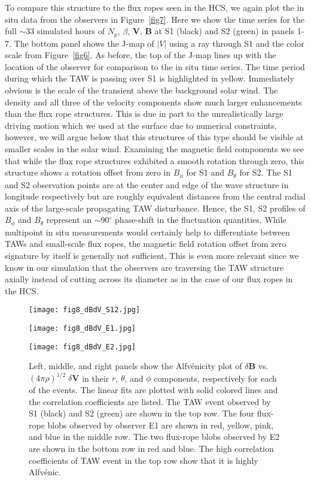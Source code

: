 \documentclass[preprint]{aastex62}
\begin{document}
To compare this structure to the flux ropes seen in the HCS, we
again plot the in situ data from the observers in Figure~\ref{fig7}.
Here we show the time series for the full $\sim$33 simulated hours of
$N_p$, $\beta$, $\boldsymbol{V}$, $\boldsymbol{B}$ at S1 (black) and
S2 (green) in panels 1-7. 
%
%
The bottom panel
shows the J-map of $|V|$ using a ray through S1 and the color scale
from Figure~\ref{fig6}. As before, the top of the J-map lines up
with the location of the observer for comparison to the in situ
time series. The time period during which the TAW is passing over
S1 is highlighted in yellow. Immediately obvious is the scale of
the transient above the background solar wind. The density and all
three of the velocity components show much larger enhancements
than the flux rope structures. This is due in part to the unrealistically
large driving motion which we used at the surface due to numerical
constraints, however, we will argue below that this structures of this type should
be visible at smaller scales in the solar wind. Examining the
magnetic field components we see that while the flux rope structures
exhibited a smooth rotation through zero, this structure shows a
rotation offset from zero in $B_\phi$ for S1 and $B_\theta$ for S2.
%
The S1 and S2 observation points are at the center and edge of the wave structure in 
longitude respectively but are roughly equivalent distances from the central radial axis of 
the large-scale propagating TAW disturbance. Hence, the S1, S2 profiles of $B_\phi$ and $B_\theta$ 
represent an $\sim$90$^\circ$ phase-shift in the fluctuation quantities.
%
While multipoint in situ measurements would certainly help to differentiate 
between TAWs and small-scale flux ropes, the magnetic field rotation offset 
from zero signature by itself is generally not sufficient. 
%
This is even more relevant since we know in our simulation that the observers 
are traversing the TAW structure axially instead of cutting across its diameter 
as in the case of our flux ropes in the HCS.


\begin{figure*}
	\centerline{ \texttt{[image: fig8\_dBdV\_S12.jpg]} }
	\centerline{ \texttt{[image: fig8\_dBdV\_E1.jpg]} }
	\centerline{ \texttt{[image: fig8\_dBdV\_E2.jpg]} }
	\caption{Left, middle, and right panels show the Alfv\'{e}nicity
	plot of $\delta \boldsymbol{B}$ vs. $(4\pi\rho)^{1/2} \; \delta
	\boldsymbol{V}$ in their $r$, $\theta$, and $\phi$ components,
	respectively for each of the events. The linear fits are plotted with solid colored lines and the correlation coefficients are listed. The TAW event observed by S1 (black) and S2 (green) are shown in the top row. The four flux-rope blobs observed by observer E1 are shown in red, yellow, pink, and blue in the middle row. The two flux-rope blobs observed by E2 are shown in the bottom row in red and blue. The high correlation coefficients of TAW event in the top row show that it is highly Alfv\'{e}nic. } 
	\label{fig8}
\end{figure*}
\end{document}
